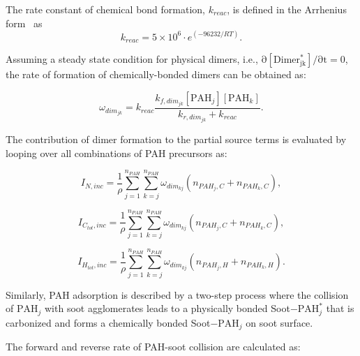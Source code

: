 The rate constant of chemical bond formation, $k_{reac}$, is defined in the Arrhenius form~\cite{naseri2022simulating} as
\begin{equation}
	k_{reac} = 5\times10^6\cdot e^{(-96232/RT)}
	\label{eqn:kc_reacdim}.
\end{equation}

Assuming a steady state condition for physical dimers, i.e., $\mathrm{\partial [Dimer^*_{jk}]/\partial t=0}$, the rate of formation of chemically-bonded dimers can be obtained as:

\begin{equation}
	\omega_{dim_{jk}} = k_{reac}\frac{k_{f,dim_{jk}}[\mathrm{PAH}_j][\mathrm{PAH}_k]}
	{k_{r,dim_{jk}}+k_{reac}}
	\label{eqn:chemdimer_reacdim}.
\end{equation}

The contribution of dimer formation to the partial source terms is evaluated by looping over all combinations of PAH precursors as:


\begin{equation}
	I_{N,{inc}} = 
	\frac{1}{\rho}
	\sum_{j=1}^{n_{PAH}} \sum_{k=j}^{n_{PAH}}  \omega_{dim_{kj}} 
	\left(
	n_{PAH_j,C}+n_{PAH_k,C}
	\right),
	\label{eqn:IN_inc}
\end{equation}

\begin{equation}
	I_{C_{tot},{inc}} = 
	\frac{1}{\rho}
	\sum_{j=1}^{n_{PAH}} \sum_{k=j}^{n_{PAH}}  \omega_{dim_{kj}} 
	\left(
	n_{PAH_j,C}+n_{PAH_k,C}
	\right),
	\label{eqn:ICtot_inc}
\end{equation}

\begin{equation}
	I_{H_{tot},{inc}} = 
	\frac{1}{\rho}
	\sum_{j=1}^{n_{PAH}} \sum_{k=j}^{n_{PAH}}  \omega_{dim_{kj}} 
	\left(
	n_{PAH_j,H}+n_{PAH_k,H}
	\right).
	\label{eqn:IHtot_inc}
\end{equation}

Similarly, PAH adsorption is described by a two-step process where the collision of $\mathrm{PAH}_j$ with soot agglomerates leads to a physically bonded Soot$-$$\mathrm{PAH}^*_j$ that is carbonized and forms a chemically bonded Soot$-$$\mathrm{PAH}_j$ on soot surface.



The forward and reverse rate of PAH-soot collision are calculated as:


